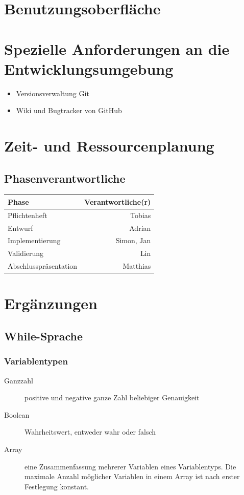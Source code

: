 \documentclass[a4paper,10pt]{article}
\begin{document}
\section{Benutzungsoberfläche}

\section{Spezielle Anforderungen an die Entwicklungsumgebung}
\begin{itemize}
  \item Versionsverwaltung Git
  \item Wiki und Bugtracker von GitHub
\end{itemize}

\section{Zeit- und Ressourcenplanung}
\subsection{Phasenverantwortliche}
\begin{tabular}[h]{| l | r |}
\hline
\textbf{Phase} & \textbf{Verantwortliche(r)}\\
\hline
Pflichtenheft & Tobias\\
\hline
Entwurf & Adrian\\
\hline
Implementierung & Simon, Jan\\
\hline
Validierung & Lin\\
\hline
Abschlusspräsentation & Matthias\\
\hline
\end{tabular}


\section{Ergänzungen}
\subsection{While-Sprache}
\subsubsection{Variablentypen}
\begin{description}
\item[Ganzzahl] positive und negative ganze Zahl beliebiger Genauigkeit
\item[Boolean] Wahrheitswert, entweder wahr oder falsch
\item[Array] eine Zusammenfassung mehrerer Variablen eines Variablentyps. Die maximale Anzahl möglicher Variablen in einem Array ist nach erster Festlegung konstant.
\end{description}
\end{document}
